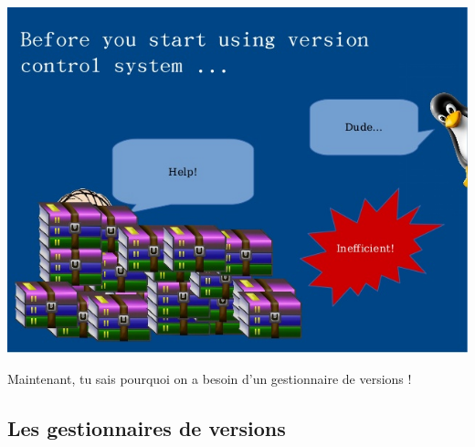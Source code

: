\documentclass[12pt,a4paper]{article}
\begin{document}
\begin{center}
\includegraphics[width=.5\linewidth]{before_lost}
\end{center}

Maintenant, tu sais pourquoi on a besoin d'un gestionnaire de versions !

\subsection{Les gestionnaires de versions}
\end{document}
